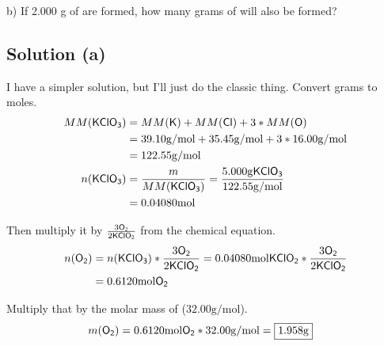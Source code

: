 \documentclass[10pt]{article}
\begin{document}
        \noindent
        b) If 2.000 g of  are formed, how many grams of  will also be formed?

        \subsection{Solution (a)}
            I have a simpler solution, but I'll just do the classic thing.
            Convert grams to moles.
            \begin{align}
                MM(\ce{KClO3})  &=  MM(\ce{K}) + MM(\ce{Cl}) + 3 * MM(\ce{O})\\
                    &=  39.10 \unit{\gram/\mole} + 35.45 \unit{\gram/\mole} + 3 * 16.00 \unit{\gram/\mole}\\
                    &=  122.55 \unit{\gram/\mole}\\
                n(\ce{KClO3})   &=  \frac{m}{MM(\ce{KClO3})}
                    =   \frac{5.000 \unit{\gram} \ce{KClO3}}{122.55 \unit{\gram/\mole}}\\
                    &=  0.04080 \unit{\mole}
            \end{align}

            Then multiply it by $\frac{3 \ce{O2}}{2 \ce{KClO2}}$ from the chemical equation.
            \begin{align}
                n(\ce{O2})  &=  n(\ce{KClO3}) * \frac{3 \ce{O2}}{2 \ce{KClO2}}
                    =   0.04080 \unit{\mole} \ce{KClO2} * \frac{3 \ce{O2}}{2 \ce{KClO2}}\\
                    &=  0.6120 \unit{\mole} \ce{O2}
            \end{align}

            Multiply that by the molar mass of  ($32.00 \unit{\gram/\mol}$).
            \begin{align}
                m(\ce{O2})  &=  0.6120 \unit{\mole} \ce{O2} * 32.00 \unit{\gram/\mol}
                    =   \boxed{1.958 \unit{\gram}}
            \end{align}
\end{document}

